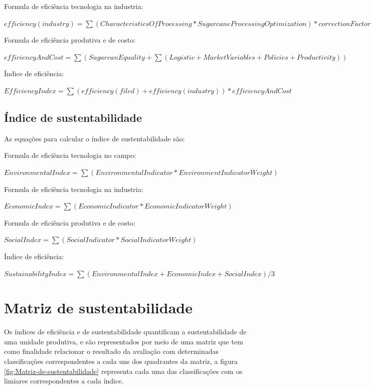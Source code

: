 Formula de eficiência tecnologia na industria:

$efficiency(industry)=\sum(CharacteristicsOfProcessing*SugarcaneProcessingOptimization)*correctionFactor(0.2)$

Formula de eficiência produtiva e de costo:

$efficiencyAndCost=\sum(SugarcanEquality+\sum(Logistic+MarketVariables+Policies+Productivity))$

Índice de eficiência:

$EfficiencyIndex=\sum(efficiency(filed)+efficiency(industry))*efficiencyAndCost$

\subsection*{Índice de sustentabilidade}

As equações para calcular o índice de sustentabilidade são:

Formula de eficiência tecnologia no campo:

$EnvironmentalIndex=\sum(EnvironmentalIndicator*EnvironmentIndicatorWeight)$

Formula de eficiência tecnologia na industria:

$EconomicIndex=\sum(EconomicIndicator*EconomicIndicatorWeight)$

Formula de eficiência produtiva e de costo:

$SocialIndex=\sum(SocialIndicator*SocialIndicatorWeight)$

Índice de eficiência:

$SustainabilityIndex=\sum(EnvironmentalIndex+EconomicIndex+SocialIndex)/3$

\section{Matriz de sustentabilidade}

Os índices de eficiência e de sustentabilidade quantificam a sustentabilidade
de uma unidade produtiva, e são representados por meio de uma matriz
que tem como finalidade relacionar o resultado da avaliação com determinadas
classificações correspondentes a cada uns dos quadrantes da matriz,
a figura \ref{fig:Matriz-de-sustentabilidade} representa cada uma
das classificações com os limiares correspondentes a cada índice.

